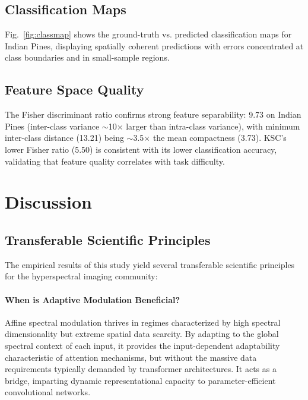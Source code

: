 \documentclass[pdflatex,sn-mathphys-num]{sn-jnl}
\theoremstyle{thmstyleone}
\theoremstyle{thmstyletwo}
\theoremstyle{thmstylethree}
\begin{document}
\subsection{Classification Maps}

Fig.~\ref{fig:classmap} shows the ground-truth vs. predicted classification maps for Indian Pines, displaying spatially coherent predictions with errors concentrated at class boundaries and in small-sample regions.

\subsection{Feature Space Quality}

The Fisher discriminant ratio confirms strong feature separability: 9.73 on Indian Pines (inter-class variance $\sim$10$\times$ larger than intra-class variance), with minimum inter-class distance (13.21) being $\sim$3.5$\times$ the mean compactness (3.73). KSC's lower Fisher ratio (5.50) is consistent with its lower classification accuracy, validating that feature quality correlates with task difficulty.



\section{Discussion}

\subsection{Transferable Scientific Principles}
The empirical results of this study yield several transferable scientific principles for the hyperspectral imaging community:

\paragraph{When is Adaptive Modulation Beneficial?}
Affine spectral modulation thrives in regimes characterized by high spectral dimensionality but extreme spatial data scarcity. By adapting to the global spectral context of each input, it provides the input-dependent adaptability characteristic of attention mechanisms, but without the massive data requirements typically demanded by transformer architectures. It acts as a bridge, imparting dynamic representational capacity to parameter-efficient convolutional networks.
\end{document}

